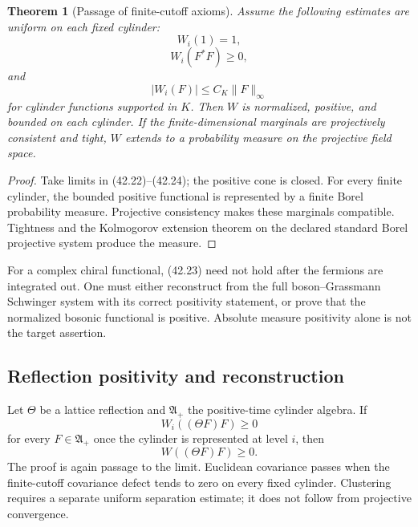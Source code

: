 \documentclass[11pt]{article}
\newtheorem{theorem}{Theorem}[section]
\begin{document}
\begin{theorem}[Passage of finite-cutoff axioms]
\label{thm:v11v42-axioms}
Assume the following estimates are uniform on each fixed cylinder:
\[
 W_i(1)=1,
 \tag{42.22}
\]
\[
 W_i(F^*F)\geq0,
 \tag{42.23}
\]
and
\[
 |W_i(F)|\leq C_K\|F\|_\infty
 \tag{42.24}
\]
for cylinder functions supported in \(K\).  Then \(W\) is normalized,
positive, and bounded on each cylinder.  If the finite-dimensional
marginals are projectively consistent and tight, \(W\) extends to a
probability measure on the projective field space.
\end{theorem}

\begin{proof}
Take limits in (42.22)--(42.24); the positive cone is closed.
For every finite cylinder, the bounded positive functional is
represented by a finite Borel probability measure.  Projective
consistency makes these marginals compatible.  Tightness and the
Kolmogorov extension theorem on the declared standard Borel projective
system produce the measure.
\end{proof}

For a complex chiral functional, (42.23) need not hold after the
fermions are integrated out.  One must either reconstruct from the full
boson--Grassmann Schwinger system with its correct positivity statement,
or prove that the normalized bosonic functional is positive.  Absolute
measure positivity alone is not the target assertion.

\subsection{Reflection positivity and reconstruction}

Let \(\Theta\) be a lattice reflection and
\(\mathfrak A_+\) the positive-time cylinder algebra.  If
\[
 W_i((\Theta F)F)\geq0
 \tag{42.25}
\]
for every \(F\in\mathfrak A_+\) once the cylinder is represented at
level \(i\), then
\[
 W((\Theta F)F)\geq0.
 \tag{42.26}
\]
The proof is again passage to the limit.  Euclidean covariance passes
when the finite-cutoff covariance defect tends to zero on every fixed
cylinder.  Clustering requires a separate uniform separation estimate;
it does not follow from projective convergence.
\end{document}
